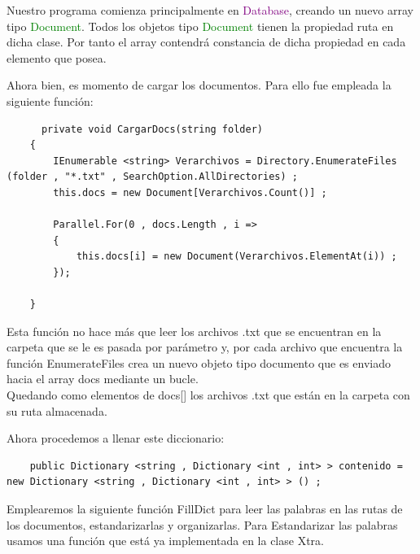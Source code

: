 \documentclass{beamer}
\begin{document}
\begin{frame}
    \Large Nuestro programa comienza principalmente en \textcolor{purple}{Database}, creando un nuevo array tipo \textcolor{green}{Document}.
    Todos los objetos tipo \textcolor{green}{Document} tienen la propiedad ruta en dicha clase. Por
tanto el array contendrá constancia de dicha propiedad en cada elemento que
posea. 

\end{frame}

\begin{frame}[fragile]
    Ahora bien, es momento de cargar los documentos. Para ello fue empleada la siguiente función:


\begin{lstlisting}
      private void CargarDocs(string folder)
    {
        IEnumerable <string> Verarchivos = Directory.EnumerateFiles (folder , "*.txt" , SearchOption.AllDirectories) ;
        this.docs = new Document[Verarchivos.Count()] ;
       
        Parallel.For(0 , docs.Length , i => 
        {
            this.docs[i] = new Document(Verarchivos.ElementAt(i)) ;           
        });

    }

\end{lstlisting}

\end{frame}


\begin{frame}
   \Large Esta función no hace más que leer los archivos .txt que se encuentran en la carpeta que se le es pasada por parámetro y, por cada 
archivo que encuentra la función \textcolor{green!40!black}{EnumerateFiles} crea un nuevo objeto tipo documento que es enviado hacia el array docs mediante un bucle.\\
Quedando como elementos de docs[] los archivos .txt que están en la carpeta con su ruta almacenada.

\end{frame}

\begin{frame}[fragile]
    Ahora procedemos a llenar este diccionario:
    \begin{lstlisting}
    public Dictionary <string , Dictionary <int , int> > contenido = new Dictionary <string , Dictionary <int , int> > () ;  
\end{lstlisting}

\Large Emplearemos la siguiente función FillDict para leer las palabras en las rutas de los documentos, estandarizarlas y organizarlas.
Para Estandarizar las palabras usamos una función que está ya implementada en la clase Xtra.

\end{frame}
\end{document}
